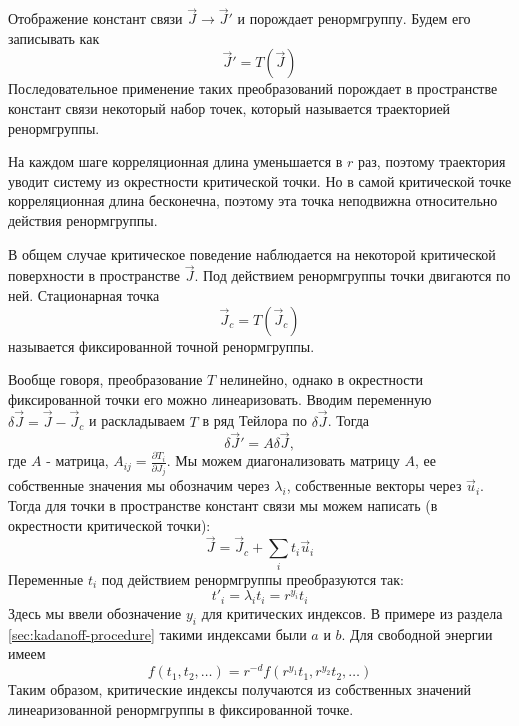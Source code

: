 \documentclass[a4paper,12pt]{article} \usepackage[utf8x]{inputenc} \usepackage[russian]{babel}
\theoremstyle{definition} \newtheorem{corollary}{Corollary}[theorem] \theoremstyle{definition}
\begin{document}
Отображение констант связи $\vec J\to\vec J'$ и порождает ренормгруппу. Будем его записывать как
\begin{equation}
  \label{eq:53} \vec J'=T(\vec J)
\end{equation} Последовательное применение таких преобразований порождает в пространстве констант
связи некоторый набор точек, который называется траекторией ренормгруппы.

На каждом шаге корреляционная длина уменьшается в $r$ раз, поэтому траектория уводит систему из
окрестности критической точки. Но в самой критической точке корреляционная длина бесконечна, поэтому
эта точка неподвижна относительно действия ренормгруппы.

В общем случае критическое поведение наблюдается на некоторой критической поверхности в пространстве
$\vec J$. Под действием ренормгруппы точки двигаются по ней. Стационарная точка
\begin{equation}
  \label{eq:54} \vec J_c=T(\vec J_c)
\end{equation} называется фиксированной точной ренормгруппы.

Вообще говоря, преобразование $T$ нелинейно, однако в окрестности фиксированной точки его можно
линеаризовать. Вводим переменную $\delta\vec J=\vec J-\vec J_c$ и раскладываем $T$ в ряд Тейлора по
$\delta\vec J$. Тогда
\begin{equation}
  \label{eq:59} \delta\vec J'=A\delta\vec J,
\end{equation} где $A$ - матрица, $A_{ij}=\frac{\partial T_i}{\partial J_j}$. Мы можем
диагонализовать матрицу $A$, ее собственные значения мы обозначим через $\lambda_i$, собственные
векторы через $\vec u_i$. Тогда для точки в пространстве констант связи мы можем написать (в
окрестности критической точки):
\begin{equation}
  \label{eq:60} \vec J=\vec J_c+\sum_i t_i \vec u_i
\end{equation} Переменные $t_i$ под действием ренормгруппы преобразуются так:
\begin{equation}
  \label{eq:61} t'_i=\lambda_i t_i=r^{y_i} t_i
\end{equation} Здесь мы ввели обозначение $y_i$ для критических индексов. В примере из раздела
\ref{sec:kadanoff-procedure} такими индексами были $a$ и $b$. Для свободной энергии имеем
\begin{equation}
  \label{eq:62} f(t_1,t_2,\dots)=r^{-d} f(r^{y_1}t_1,r^{y_2}t_2,\dots)
\end{equation} Таким образом, критические индексы получаются из собственных значений линеаризованной
ренормгруппы в фиксированной точке.
\end{document}
